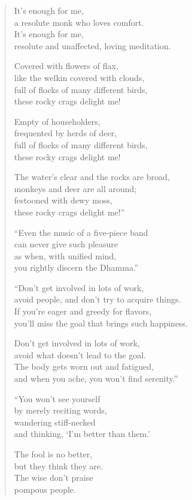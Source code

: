\documentclass[12pt,openany]{book}%
\begin{document}
\begin{verse}
It’s enough for me, \\
a resolute monk who loves comfort. \\
It’s enough for me, \\
resolute and unaffected, loving meditation. 

Covered with flowers of flax, \\
like the welkin covered with clouds, \\
full of flocks of many different birds, \\
these rocky crags delight me! 

Empty of householders, \\
frequented by herds of deer, \\
full of flocks of many different birds, \\
these rocky crags delight me! 

The water’s clear and the rocks are broad, \\
monkeys and deer are all around; \\
festooned with dewy moss, \\
these rocky crags delight me!” 

“Even the music of a five-piece band \\
can never give such pleasure \\
as when, with unified mind, \\
you rightly discern the Dhamma.” 

“Don’t get involved in lots of work, \\
avoid people, and don’t try to acquire things. \\
If you’re eager and greedy for flavors, \\
you’ll miss the goal that brings such happiness. 

Don’t get involved in lots of work, \\
avoid what doesn’t lead to the goal. \\
The body gets worn out and fatigued, \\
and when you ache, you won’t find serenity.” 

“You won’t see yourself \\
by merely reciting words, \\
wandering stiff-necked \\
and thinking, ‘I’m better than them.’ 

The fool is no better, \\
but they think they are. \\
The wise don’t praise \\
pompous people. 


\end{verse}
\end{document}
